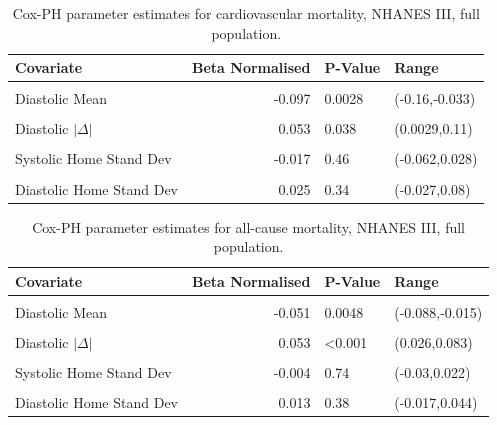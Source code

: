 \documentclass[
]{article}
\begin{document}
\begin{table}[!h]
\centering
\caption{\label{tab:freqCVDNF}Cox-PH parameter estimates for cardiovascular mortality, NHANES III, full population.}
\centering
\begin{tabular}[t]{lrll}
\toprule
Covariate & Beta Normalised & P-Value & Range\\
\midrule
\cellcolor{gray!10}{Systolic Mean} & \cellcolor{gray!10}{0.312} & \cellcolor{gray!10}{<0.001} & \cellcolor{gray!10}{(0.25,0.37)}\\
Diastolic Mean & -0.097 & 0.0028 & (-0.16,-0.033)\\
\cellcolor{gray!10}{Systolic $|\Delta|$} & \cellcolor{gray!10}{0.065} & \cellcolor{gray!10}{0.0025} & \cellcolor{gray!10}{(0.023,0.11)}\\
Diastolic $|\Delta|$ & 0.053 & 0.038 & (0.0029,0.11)\\
\cellcolor{gray!10}{Systolic Clinic Stand Dev} & \cellcolor{gray!10}{-0.008} & \cellcolor{gray!10}{0.72} & \cellcolor{gray!10}{(-0.054,0.036)}\\
Systolic Home Stand Dev & -0.017 & 0.46 & (-0.062,0.028)\\
\cellcolor{gray!10}{Diastolic Clinic Stand Dev} & \cellcolor{gray!10}{-0.027} & \cellcolor{gray!10}{0.3} & \cellcolor{gray!10}{(-0.08,0.025)}\\
Diastolic Home Stand Dev & 0.025 & 0.34 & (-0.027,0.08)\\
\bottomrule
\end{tabular}
\end{table}

\begin{table}[!h]
\centering
\caption{\label{tab:freqALLNF}Cox-PH parameter estimates for all-cause mortality, NHANES III, full population.}
\centering
\begin{tabular}[t]{lrll}
\toprule
Covariate & Beta Normalised & P-Value & Range\\
\midrule
\cellcolor{gray!10}{Systolic Mean} & \cellcolor{gray!10}{0.166} & \cellcolor{gray!10}{<0.001} & \cellcolor{gray!10}{(0.13,0.19)}\\
Diastolic Mean & -0.051 & 0.0048 & (-0.088,-0.015)\\
\cellcolor{gray!10}{Systolic $|\Delta|$} & \cellcolor{gray!10}{0.047} & \cellcolor{gray!10}{<0.001} & \cellcolor{gray!10}{(0.022,0.07)}\\
Diastolic $|\Delta|$ & 0.053 & <0.001 & (0.026,0.083)\\
\cellcolor{gray!10}{Systolic Clinic Stand Dev} & \cellcolor{gray!10}{-0.009} & \cellcolor{gray!10}{0.49} & \cellcolor{gray!10}{(-0.036,0.017)}\\
Systolic Home Stand Dev & -0.004 & 0.74 & (-0.03,0.022)\\
\cellcolor{gray!10}{Diastolic Clinic Stand Dev} & \cellcolor{gray!10}{-0.005} & \cellcolor{gray!10}{0.72} & \cellcolor{gray!10}{(-0.033,0.023)}\\
Diastolic Home Stand Dev & 0.013 & 0.38 & (-0.017,0.044)\\
\bottomrule
\end{tabular}
\end{table}
\end{document}
